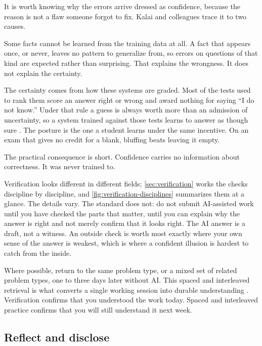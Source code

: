 \documentclass{SIAMbook2023}
\begin{document}
It is worth knowing why the errors arrive dressed as confidence, because the reason is not a flaw someone forgot to fix. Kalai and colleagues trace it to two causes.

Some facts cannot be learned from the training data at all. A fact that appears once, or never, leaves no pattern to generalize from, so errors on questions of that kind are expected rather than surprising. That explains the wrongness. It does not explain the certainty.

The certainty comes from how these systems are graded. Most of the tests used to rank them score an answer right or wrong and award nothing for saying ``I do not know.'' Under that rule a guess is always worth more than an admission of uncertainty, so a system trained against those tests learns to answer as though sure \citep{kalai2025hallucinate}. The posture is the one a student learns under the same incentive. On an exam that gives no credit for a blank, bluffing beats leaving it empty.

The practical consequence is short. Confidence carries no information about correctness. It was never trained to.

Verification looks different in different fields; \cref{sec:verification} works the checks discipline by discipline, and \cref{fig:verification-disciplines} summarizes them at a glance. The details vary. The standard does not: do not submit AI-assisted work until you have checked the parts that matter, until you can explain why the answer is right and not merely confirm that it looks right. The AI answer is a draft, not a witness. An outside check is worth most exactly where your own sense of the answer is weakest, which is where a confident illusion is hardest to catch from the inside.

Where possible, return to the same problem type, or a mixed set of related problem types, one to three days later without AI. This spaced and interleaved retrieval is what converts a single working session into durable understanding \citep{rohrer2007shuffling}. Verification confirms that you understood the work today. Spaced and interleaved practice confirms that you will still understand it next week.

\subsection{Reflect and disclose}
\label{subsec:reflect-disclose}%
\end{document}

